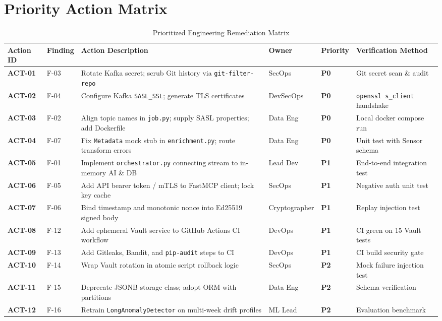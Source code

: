 \documentclass[10pt,a4paper]{report}
\begin{document}
\section{Priority Action Matrix}
\begin{table}[htbp]
\centering
\scriptsize
\caption{Prioritized Engineering Remediation Matrix}
\label{tab:action_matrix}
\begin{tabularx}{\textwidth}{llXllp{2.8cm}}
\toprule
\textbf{Action ID} & \textbf{Finding} & \textbf{Action Description} & \textbf{Owner} & \textbf{Priority} & \textbf{Verification Method} \\
\midrule
\textbf{ACT-01} & F-03 & Rotate Kafka secret; scrub Git history via \texttt{git-filter-repo} & SecOps & \textbf{P0} & Git secret scan \& audit \\
\textbf{ACT-02} & F-04 & Configure Kafka \texttt{SASL\_SSL}; generate TLS certificates & DevSecOps & \textbf{P0} & \texttt{openssl s\_client} handshake \\
\textbf{ACT-03} & F-02 & Align topic names in \texttt{job.py}; supply SASL properties; add Dockerfile & Data Eng & \textbf{P0} & Local docker compose run \\
\textbf{ACT-04} & F-07 & Fix \texttt{Metadata} mock stub in \texttt{enrichment.py}; route transform errors & Data Eng & \textbf{P0} & Unit test with Sensor schema \\
\textbf{ACT-05} & F-01 & Implement \texttt{orchestrator.py} connecting stream to in-memory AI \& DB & Lead Dev & \textbf{P1} & End-to-end integration test \\
\textbf{ACT-06} & F-05 & Add API bearer token / mTLS to FastMCP client; lock key cache & SecOps & \textbf{P1} & Negative auth unit test \\
\textbf{ACT-07} & F-06 & Bind timestamp and monotonic nonce into Ed25519 signed body & Cryptographer & \textbf{P1} & Replay injection test \\
\textbf{ACT-08} & F-12 & Add ephemeral Vault service to GitHub Actions CI workflow & DevOps & \textbf{P1} & CI green on 15 Vault tests \\
\textbf{ACT-09} & F-13 & Add Gitleaks, Bandit, and \texttt{pip-audit} steps to CI & DevOps & \textbf{P1} & CI build security gate \\
\textbf{ACT-10} & F-14 & Wrap Vault rotation in atomic script rollback logic & SecOps & \textbf{P2} & Mock failure injection test \\
\textbf{ACT-11} & F-15 & Deprecate JSONB storage class; adopt ORM with partitions & Data Eng & \textbf{P2} & Schema verification \\
\textbf{ACT-12} & F-16 & Retrain \texttt{LongAnomalyDetector} on multi-week drift profiles & ML Lead & \textbf{P2} & Evaluation benchmark \\
\bottomrule
\end{tabularx}
\end{table}
\end{document}
